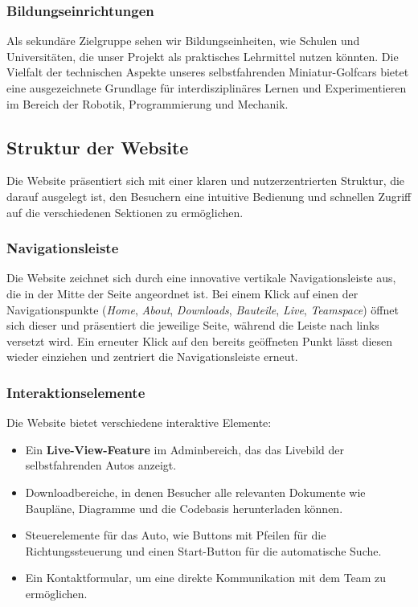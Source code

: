 \subsubsection{Bildungseinrichtungen}
Als sekundäre Zielgruppe sehen wir Bildungseinheiten, wie Schulen und Universitäten, die unser Projekt als praktisches Lehrmittel nutzen könnten. Die Vielfalt der technischen Aspekte unseres selbstfahrenden Miniatur-Golfcars bietet eine ausgezeichnete Grundlage für interdisziplinäres Lernen und Experimentieren im Bereich der Robotik, Programmierung und Mechanik.

\subsection{Struktur der Website}

Die Website präsentiert sich mit einer klaren und nutzerzentrierten Struktur, die darauf ausgelegt ist, den Besuchern eine intuitive Bedienung und schnellen Zugriff auf die verschiedenen Sektionen zu ermöglichen.

\subsubsection{Navigationsleiste}
Die Website zeichnet sich durch eine innovative vertikale Navigationsleiste aus, die in der Mitte der Seite angeordnet ist. Bei einem Klick auf einen der Navigationspunkte (\textit{Home}, \textit{About}, \textit{Downloads}, \textit{Bauteile}, \textit{Live}, \textit{Teamspace}) öffnet sich dieser und präsentiert die jeweilige Seite, während die Leiste nach links versetzt wird. Ein erneuter Klick auf den bereits geöffneten Punkt lässt diesen wieder einziehen und zentriert die Navigationsleiste erneut.

\subsubsection{Interaktionselemente}
Die Website bietet verschiedene interaktive Elemente:
\begin{itemize}
    \item Ein \textbf{Live-View-Feature} im Adminbereich, das das Livebild der selbstfahrenden Autos anzeigt.
    \item Downloadbereiche, in denen Besucher alle relevanten Dokumente wie Baupläne, Diagramme und die Codebasis herunterladen können.
    \item Steuerelemente für das Auto, wie Buttons mit Pfeilen für die Richtungssteuerung und einen Start-Button für die automatische Suche.
    \item Ein Kontaktformular, um eine direkte Kommunikation mit dem Team zu ermöglichen.
\end{itemize}

